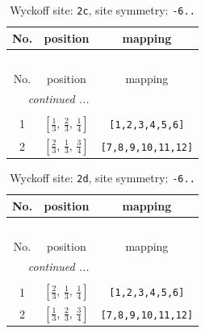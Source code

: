 \documentclass[fleqn,8pt]{jsarticle}
\begin{document}
\renewcommand{\arraystretch}{1.2}
\begin{longtable}{ccc}
\caption{Wyckoff site: {\tt 2c}, site symmetry: {\tt -6..}}
 \\
 \hline \hline
No. & position & mapping \\ \hline \endfirsthead

\multicolumn{2}{l}{\tablename\ \thetable{}} \\
 \hline \hline
No. & position & mapping \\ \hline \endhead

 \hline \hline
\multicolumn{2}{r}{\footnotesize\it continued ...} \\ \endfoot

 \hline \hline
\multicolumn{2}{r}{} \\ \endlastfoot

1 & $\left[ \frac{1}{3},\, \frac{2}{3},\, \frac{1}{4} \right]$ & {\tt [1,2,3,4,5,6]} \\ \hline
2 & $\left[ \frac{2}{3},\, \frac{1}{3},\, \frac{3}{4} \right]$ & {\tt [7,8,9,10,11,12]} \\
\end{longtable}
\renewcommand{\arraystretch}{1.2}
\begin{longtable}{ccc}
\caption{Wyckoff site: {\tt 2d}, site symmetry: {\tt -6..}}
 \\
 \hline \hline
No. & position & mapping \\ \hline \endfirsthead

\multicolumn{2}{l}{\tablename\ \thetable{}} \\
 \hline \hline
No. & position & mapping \\ \hline \endhead

 \hline \hline
\multicolumn{2}{r}{\footnotesize\it continued ...} \\ \endfoot

 \hline \hline
\multicolumn{2}{r}{} \\ \endlastfoot

1 & $\left[ \frac{2}{3},\, \frac{1}{3},\, \frac{1}{4} \right]$ & {\tt [1,2,3,4,5,6]} \\ \hline
2 & $\left[ \frac{1}{3},\, \frac{2}{3},\, \frac{3}{4} \right]$ & {\tt [7,8,9,10,11,12]} \\
\end{longtable}
\renewcommand{\arraystretch}{1.2}
\end{document}
